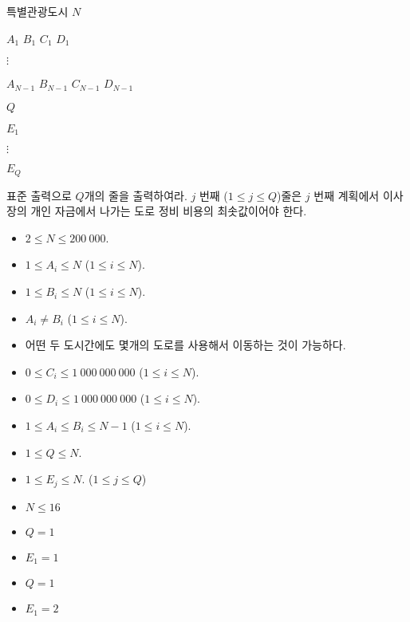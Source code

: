 \begin{problem}{특별관광도시}
	$N$
	
	$A_1$ $B_1$ $C_1$ $D_1$
	
	$\vdots$
	
	$A_{N-1}$ $B_{N-1}$ $C_{N-1}$ $D_{N-1}$

	$Q$
	
	$E_1$
	
	$\vdots$
	
	$E_Q$
	
	\OutputFile
	
	표준 출력으로 $Q$개의 줄을 출력하여라. $j$ 번째 ($1 \le j \le Q$)줄은 $j$ 번째 계획에서 이사장의 개인 자금에서 나가는 도로 정비 비용의 최솟값이어야 한다.
	
	\Constraints
	
	\begin{itemize}
	
	\item $2 \le N \le 200\ 000$.
	\item $1 \le A_i \le N$ ($1 \le i \le N$).
	\item $1 \le B_i \le N$ ($1 \le i \le N$).
	\item $A_i \ne B_i$ ($1 \le i \le N$).
	\item 어떤 두 도시간에도 몇개의 도로를 사용해서 이동하는 것이 가능하다.
	\item $0 \le C_i \le 1\ 000\ 000\ 000$ ($1 \le i \le N$).
	\item $0 \le D_i \le 1\ 000\ 000\ 000$ ($1 \le i \le N$).
	\item $1 \le A_i \le B_i \le N-1$ ($1 \le i \le N$).
	\item $1 \le Q \le N$.
	\item $1 \le E_j \le N$. ($1 \le j \le Q$)
		
	\end{itemize}
	
	
	\begin{itemize}
		\item $N \le 16$
	\end{itemize}
	
	\begin{itemize}
		\item $Q = 1$
		\item $E_1 = 1$
	\end{itemize}


	\begin{itemize}
		\item $Q = 1$
		\item $E_1 = 2$
	\end{itemize}
	

\end{problem}
